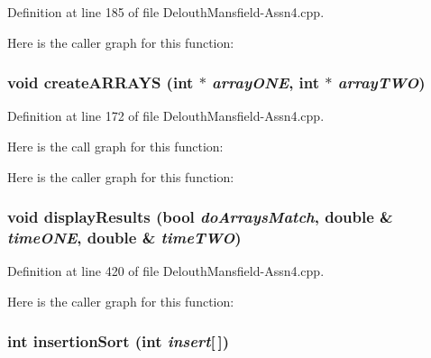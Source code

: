 Definition at line 185 of file DelouthMansfield-\/Assn4.cpp.



Here is the caller graph for this function:

\hypertarget{_delouth_mansfield-_assn4_8cpp_a554ac789a02f1a6c2a1340d356ddf18a}{
\subsubsection[{createARRAYS}]{\setlength{\rightskip}{0pt plus 5cm}void createARRAYS (int $\ast$ {\em arrayONE}, \/  int $\ast$ {\em arrayTWO})}}
\label{_delouth_mansfield-_assn4_8cpp_a554ac789a02f1a6c2a1340d356ddf18a}


Definition at line 172 of file DelouthMansfield-\/Assn4.cpp.



Here is the call graph for this function:



Here is the caller graph for this function:

\hypertarget{_delouth_mansfield-_assn4_8cpp_a95da63b4a266243c36e025d0fcc6b757}{
\subsubsection[{displayResults}]{\setlength{\rightskip}{0pt plus 5cm}void displayResults (bool {\em doArraysMatch}, \/  double \& {\em timeONE}, \/  double \& {\em timeTWO})}}
\label{_delouth_mansfield-_assn4_8cpp_a95da63b4a266243c36e025d0fcc6b757}


Definition at line 420 of file DelouthMansfield-\/Assn4.cpp.



Here is the caller graph for this function:

\hypertarget{_delouth_mansfield-_assn4_8cpp_abdd451b9bf57eb321b817db4405d65fd}{
\subsubsection[{insertionSort}]{\setlength{\rightskip}{0pt plus 5cm}int insertionSort (int {\em insert}\mbox{[}$\,$\mbox{]})}}
\label{_delouth_mansfield-_assn4_8cpp_abdd451b9bf57eb321b817db4405d65fd}


